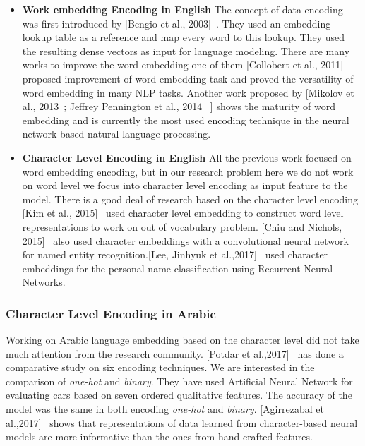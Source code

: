 \begin{itemize}
  \item \textbf{Work embedding Encoding in English} The concept of data encoding was first introduced by [Bengio et al., 2003]~\cite{Bengio2003}. They used an embedding lookup table as a reference and map every word to this lookup. They used the resulting dense vectors as input for language modeling. There are many works to improve the word embedding one of them [Collobert et al., 2011]~\cite{Collobert_2011} proposed improvement of word embedding task and proved the versatility of word embedding in many NLP tasks. Another work proposed by [Mikolov et al., 2013~\cite{Mikolov_2013};
  Jeffrey Pennington et al., 2014~\cite{Pennington_2014} ] shows the maturity of word embedding and is currently the most used encoding technique in the neural network based natural language processing.

  \item \textbf{Character Level Encoding in English} 
  All the previous work focused on word embedding encoding, but in our research problem here we do not work on word level we focus into character level encoding as input feature to the model. There is a good deal of research based on the character level encoding [Kim et al., 2015]~\cite{Kim_2015} used character level embedding to construct word level representations to work on out of vocabulary problem. [Chiu and Nichols, 2015]~\cite{Chiu_2015} also used character embeddings with a convolutional neural network for named entity recognition.[Lee, Jinhyuk et al.,2017]~\cite{ijcai_2017} used character embeddings for the personal name classification using Recurrent Neural Networks.

\end{itemize}

\subsubsection{Character Level Encoding in Arabic}\label{sec:Char_Level_Arabic}

Working on Arabic language embedding based on the character level did not take much attention from the research community. [Potdar et al.,2017]~\cite{Potdar_2017} has done a comparative study on six encoding techniques. We are interested in the comparison of \textit{one-hot} and \textit{binary}. They have used Artificial Neural Network for evaluating cars based on seven ordered qualitative features. The accuracy of the model was the same in both encoding \textit{one-hot} and \textit{binary}. [Agirrezabal et al.,2017]~\cite{Agirrezabal_2017} shows that representations of data learned from character-based neural models are more informative than the ones from hand-crafted features.

